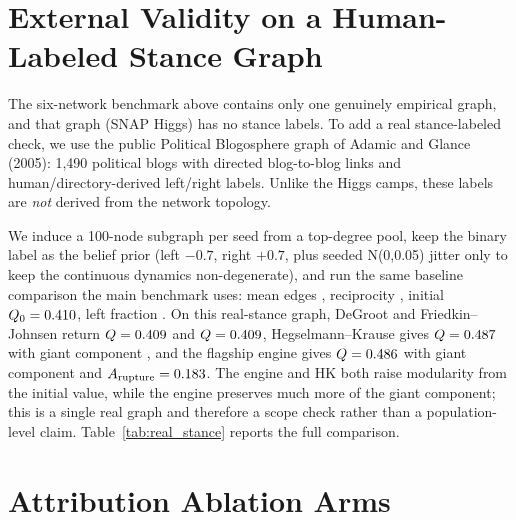 \section{External Validity on a Human-Labeled Stance Graph}
\label{app:real-stance}

The six-network benchmark above contains only one genuinely empirical graph, and that
graph (SNAP Higgs) has no stance labels. To add a real stance-labeled check, we use the
public Political Blogosphere graph of Adamic and Glance (2005): 1,490 political blogs
with directed blog-to-blog links and human/directory-derived left/right labels. Unlike
the Higgs camps, these labels are \emph{not} derived from the network topology.

We induce a 100-node subgraph per seed from a top-degree pool, keep the binary label as
the belief prior (left $-0.7$, right $+0.7$, plus seeded N(0,0.05) jitter only to keep the
continuous dynamics non-degenerate), and run the same baseline comparison the main
benchmark uses: mean edges \StanceEdges{}, reciprocity \StanceReciprocity{}, initial
$Q_0=0.410$, left fraction \StanceLeftFrac{}. On this real-stance graph,
DeGroot and Friedkin--Johnsen return $Q=0.409$ and $Q=0.409$,
Hegselmann--Krause gives $Q=0.487$ with giant component \StanceGiantHK{}, and the
flagship engine gives $Q=0.486$ with giant component \StanceGiantEngine{} and
$A_{\mathrm{rupture}}=0.183{}$. The engine and HK both raise modularity from
the initial value, while the engine preserves much more of the giant component; this is a
single real graph and therefore a scope check rather than a population-level claim.
Table~\ref{tab:real_stance} reports the full comparison.

\begin{table}[t]
\centering
\small
\caption{\textbf{External-validity check on the public human-labeled Political
Blogosphere graph (Adamic--Glance 2005).} Real left/right stance labels, 10 seeds,
N=100, 25 rounds. Generated from \texttt{results/phase8\_real\_stance.json} by
\texttt{scripts/generate\_paper\_tables.py}.}
\label{tab:real_stance}

\end{table}

\section{Attribution Ablation Arms}
\label{app:attribution}

